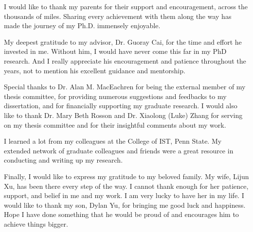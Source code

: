 I would like to thank my parents for their support and encouragement, across the thousands of miles. Sharing every achievement with them along the way has made the journey of my Ph.D. immensely enjoyable.

My deepest gratitude to my advisor, Dr. Guoray Cai, for the time and effort he invested in me. Without him, I would have never come this far in my PhD research. And I really appreciate his encouragement and patience throughout the years, not to mention his excellent guidance and mentorship.

Special thanks to Dr. Alan M. MacEachren for being the external member of my thesis committee, for providing numerous suggestions and feedbacks to my dissertation, and for financially supporting my graduate research. I would also like to thank Dr. Mary Beth Rosson and Dr. Xiaolong (Luke) Zhang for serving on my thesis committee and for their insightful comments about my work. 

I learned a lot from my colleagues at the College of IST, Penn State. My extended network of graduate colleagues and friends were a great resource in conducting and writing up my research. 

Finally, I would like to express my gratitude to my beloved family. My wife, Lijun Xu, has been there every step of the way. I cannot thank enough for her patience, support, and belief in me and my work. I am very lucky to have her in my life. I would like to thank my son, Dylan Yu, for bringing me good luck and happiness. Hope I have done something that he would be proud of and encourages him to achieve things bigger.